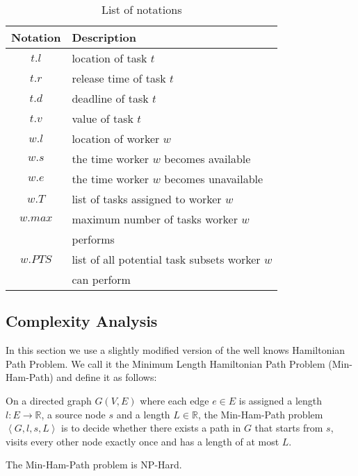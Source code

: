 \begin{table}
\begin{center}
\begin{tabular}{| c | l |} \hline
Notation	&	Description \\ \hline
$t.l$			&	location of task $t$ \\ \hline
$t.r$			&	release time of task $t$ \\ \hline
$t.d$		& 	deadline of task $t$ \\ \hline
$t.v$		&	value of task $t$ \\ \hline
$w.l$		&	location of worker $w$ \\ \hline
$w.s$		&	the time worker $w$ becomes available \\ \hline
$w.e$		&	the time worker $w$ becomes unavailable \\ \hline
$w.T$		&	list of tasks assigned to worker $w$ \\ \hline
$w.max$	&	maximum number of tasks worker $w$ \\
				&	performs \\ \hline
$w.PTS$	&	list of all potential task subsets worker $w$ \\
				&	can perform \\ \hline
\end{tabular}
\caption{List of notations}
\label{tab:notation}
\end{center}
\end{table}

\subsection{Complexity Analysis}

In this section we use a slightly modified version of the well knows Hamiltonian Path Problem. We call it the Minimum Length Hamiltonian Path Problem (Min-Ham-Path) and define it as follows:

\begin{definition}
On a directed graph $G(V,E)$ where each edge $e \in E$ is assigned a length $l: E \rightarrow \mathbb{R}$, a source node $s$ and a length $L \in \mathbb{R}$, the Min-Ham-Path problem $\left\langle G, l, s, L \right\rangle$ is to decide whether there exists a path in $G$ that starts from $s$, visits every other node exactly once and has a length of at most $L$.
\end{definition}

\begin{theorem}
\label{th:MinHam}
The Min-Ham-Path problem is NP-Hard.
\end{theorem}

